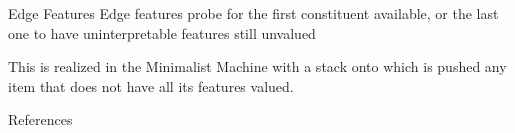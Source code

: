 \documentclass[10pt]{beamer}
\begin{document}
\begin{frame}[fragile]{Edge Features}
  Edge features probe for the first constituent available, or the last one to have uninterpretable features still unvalued
  \pause


   This is realized in the Minimalist Machine with a stack onto which is pushed any item that does not have all its features valued.

\end{frame}








\begin{frame}[allowframebreaks]{References}

  \nocite{*}
  
  

\end{frame}
\end{document}
